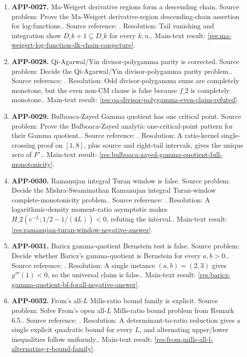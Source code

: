 \begin{enumerate}[leftmargin=*]
\item \textbf{APP-0027.} Ma-Weigert derivative regions form a descending chain.  Source problem: Prove the Ma-Weigert derivative-region descending-chain assertion for log-functions.. Source reference: \cite{app-app-0027-source}. Resolution: Tail vanishing and integration show \(D\_{k+1}\subseteq D\_k\) for every \(k,n\).. Main-text result: \ref{res:ma-weigert-log-function-dk-chain-conjecture}.
\item \textbf{APP-0028.} Qi-Agarwal/Yin divisor-polygamma parity is corrected.  Source problem: Decide the Qi-Agarwal/Yin divisor-polygamma parity problem.. Source reference: \cite{app-app-0028-source}. Resolution: Odd divisor-polygamma sums are completely monotone, but the even non-CM clause is false because \(f\_2\) is completely monotone.. Main-text result: \ref{res:qa-divisor-polygamma-even-claim-refuted}.
\item \textbf{APP-0029.} Bulboaca-Zayed Gamma quotient has one critical point.  Source problem: Prove the Bulboaca-Zayed analytic one-critical-point pattern for their Gamma quotient.. Source reference: \cite{app-app-0029-source}. Resolution: A ratio-kernel single-crossing proof on \([1,8]\), plus source and right-tail intervals, gives the unique zero of \(F'\).. Main-text result: \ref{res:bulboaca-zayed-gamma-quotient-full-monotonicity}.
\item \textbf{APP-0030.} Ramanujan integral Turan window is false.  Source problem: Decide the Mishra-Swaminathan Ramanujan integral Turan-window complete-monotonicity problem.. Source reference: \cite{app-app-0030-source}. Resolution: A logarithmic-density moment-ratio asymptotic makes \(H\_2(e^{-L};1/2-1/(4L))<0\), refuting the interval.. Main-text result: \ref{res:ramanujan-turan-window-negative-answer}.
\item \textbf{APP-0031.} Baricz gamma-quotient Bernstein test is false.  Source problem: Decide whether Baricz's gamma-quotient is Bernstein for every \(a,b>0\).. Source reference: \cite{app-app-0031-source}. Resolution: A single instance \((a,b)=(2,3)\) gives \(g'''(1)<0\), so the universal claim is false.. Main-text result: \ref{res:baricz-gamma-quotient-bf-forall-negative-answer}.
\item \textbf{APP-0032.} From's all-\(L\) Mills-ratio bound family is explicit.  Source problem: Solve From's open all-\(L\) Mills-ratio bound problem from Remark 6.5.. Source reference: \cite{app-app-0032-source}. Resolution: A determinant-to-ratio reduction gives a single explicit quadratic bound for every \(L\), and alternating upper/lower inequalities follow uniformly.. Main-text result: \ref{res:from-mills-all-l-alternating-r-bound-family}.

\end{enumerate}
